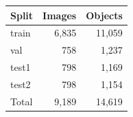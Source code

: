 \begin{tabular}{lrr}
\toprule
Split & Images & Objects \\
\midrule
train & 6,835 & 11,059 \\
val & 758 & 1,237 \\
test1 & 798 & 1,169 \\
test2 & 798 & 1,154 \\
\midrule
Total & 9,189 & 14,619 \\
\bottomrule
\end{tabular}
